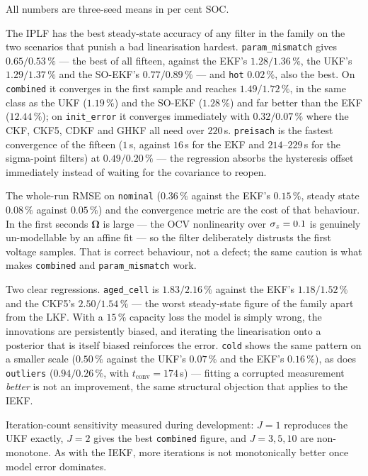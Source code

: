 All numbers are three-seed means in per cent SOC.

The IPLF has the best steady-state accuracy of any filter in the family on the two scenarios
that punish a bad linearisation hardest. \texttt{param\_mismatch} gives $0.65/0.53\,\%$ ---
the best of all fifteen, against the EKF's $1.28/1.36\,\%$, the UKF's $1.29/1.37\,\%$ and the
SO-EKF's $0.77/0.89\,\%$ --- and \texttt{hot} $0.02\,\%$, also the best. On \texttt{combined}
it converges in the first sample and reaches $1.49/1.72\,\%$, in the same class as the UKF
($1.19\,\%$) and the SO-EKF ($1.28\,\%$) and far better than the EKF ($12.44\,\%$); on
\texttt{init\_error} it converges immediately with $0.32/0.07\,\%$ where the CKF, CKF5, CDKF
and GHKF all need over $220$\,s. \texttt{preisach} is the fastest convergence of the fifteen
($1$\,s, against $16$\,s for the EKF and $214$--$229$\,s for the sigma-point filters) at
$0.49/0.20\,\%$ --- the regression absorbs the hysteresis offset immediately instead of
waiting for the covariance to reopen.

The whole-run RMSE on \texttt{nominal} ($0.36\,\%$ against the EKF's $0.15\,\%$, steady state
$0.08\,\%$ against $0.05\,\%$) and the convergence metric are the cost of that behaviour. In
the first seconds $\bm\Omega$ is large --- the OCV nonlinearity over $\sigma_z = 0.1$ is
genuinely un-modellable by an affine fit --- so the filter deliberately distrusts the first
voltage samples. That is correct behaviour, not a defect; the same caution is what makes
\texttt{combined} and \texttt{param\_mismatch} work.

Two clear regressions. \texttt{aged\_cell} is $1.83/2.16\,\%$ against the EKF's
$1.18/1.52\,\%$ and the CKF5's $2.50/1.54\,\%$ --- the worst steady-state figure of the family
apart from the LKF. With a $15\,\%$ capacity loss the model is simply wrong, the innovations
are persistently biased, and iterating the linearisation onto a posterior that is itself biased
reinforces the error. \texttt{cold} shows the same pattern on a smaller scale ($0.50\,\%$
against the UKF's $0.07\,\%$ and the EKF's $0.16\,\%$), as does \texttt{outliers}
($0.94/0.26\,\%$, with $t_{\text{conv}} = 174$\,s) --- fitting a corrupted measurement
\emph{better} is not an improvement, the same structural objection that applies to the IEKF.

Iteration-count sensitivity measured during development: $J = 1$ reproduces the UKF exactly,
$J = 2$ gives the best \texttt{combined} figure, and $J = 3,5,10$ are non-monotone. As with the
IEKF, more iterations is not monotonically better once model error dominates.

